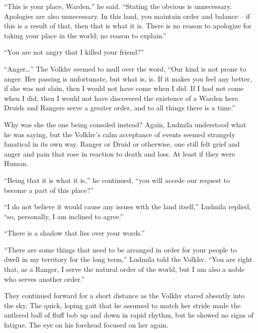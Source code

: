 “This is your place, Warden,” he said. “Stating the obvious is unnecessary. Apologies are also unnecessary. In this land, you maintain order and balance – if this is a result of that, then that is what it is. There is no reason to apologize for taking your place in the world; no reason to explain.”

 

“You are not angry that I killed your friend?”

 

“Anger…” The Volkhv seemed to mull over the word, “Our kind is not prone to anger. Her passing is unfortunate, but what is, is. If it makes you feel any better, if she was not slain, then I would not have come when I did. If I had not come when I did, then I would not have discovered the existence of a Warden here. Druids and Rangers serve a greater order, and to all things there is a time.”

 

Why was she the one being consoled instead? Again, Ludmila understood what he was saying, but the Volkhv’s calm acceptance of events seemed strangely fanatical in its own way. Ranger or Druid or otherwise, one still felt grief and anger and pain that rose in reaction to death and loss. At least if they were Human.

 

“Being that it is what it is,” he continued, “you will accede our request to become a part of this place?”

 

“I do not believe it would cause any issues with the land itself,” Ludmila replied, “so, personally, I am inclined to agree.”

 

“There is a shadow that lies over your words.”

 

“There are some things that need to be arranged in order for your people to dwell in my territory for the long term,” Ludmila told the Volkhv. “You are right that, as a Ranger, I serve the natural order of the world, but I am also a noble who serves another order.”

 

They continued forward for a short distance as the Volkhv stared absently into the sky. The quick, loping gait that he assumed to match her stride made the antlered ball of fluff bob up and down in rapid rhythm, but he showed no signs of fatigue. The eye on his forehead focused on her again.

